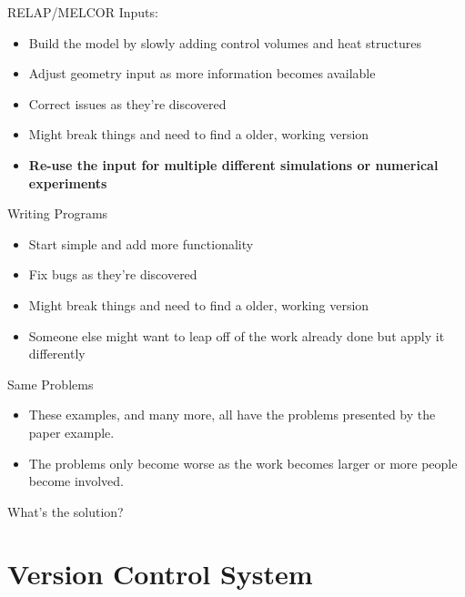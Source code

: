 \documentclass[10pt,t,xcolor=table]{UWMadBeamer}
\newenvironment{Itemize}
    {\begin{itemize}\setlength{\itemsep}{0.50em}\setlength{\leftmargin}{0.0em}\setlength{\labelwidth}{0em}}
    {\end{itemize}}
\begin{document}
    \begin{frame}{RELAP/MELCOR Inputs:}
        \begin{Itemize}
            \item{Build the model by slowly adding control volumes and heat structures}
            \item{Adjust geometry input as more information becomes available}
            \item{Correct issues as they're discovered}
            \item{Might break things and need to find a older, working version}
            \item{\textbf{Re-use the input for multiple different simulations or numerical experiments}}
        \end{Itemize}
    \end{frame}


    \begin{frame}{Writing Programs}
        \begin{Itemize}
            \item{Start simple and add more functionality}
            \item{Fix bugs as they're discovered}
            \item{Might break things and need to find a older, working version}
            \item{Someone else might want to leap off of the work already done but apply it differently}
        \end{Itemize}
    \end{frame}

    \begin{frame}{Same Problems}
        \begin{Itemize}
            \item{These examples, and many more, all have the problems presented by the paper example.}
            \item{The problems only become worse as the work becomes larger or more people become involved.}
        \end{Itemize}
        
        What's the solution?
    \end{frame}



\section{Version Control System}
\end{document}
